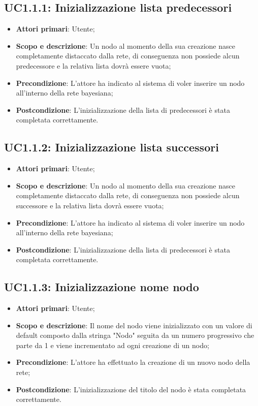 \subsection{UC1.1.1: Inizializzazione lista predecessori} 
\hypertarget{UC1.1.1}{} 
\begin{itemize} 
	\item{\textbf{Attori primari}: Utente;} 
	\item{\textbf{Scopo e descrizione}: Un nodo al momento della sua creazione nasce completamente distaccato dalla rete, di conseguenza non possiede alcun predecessore e la relativa lista dovrà essere vuota;} 
	\item{\textbf{Precondizione}: L'attore ha indicato al sistema di voler inserire un nodo all'interno della rete bayesiana;} 
	\item{\textbf{Postcondizione}: L'inizializzazione della lista di predecessori è stata completata correttamente.} 
\end{itemize} 
\subsection{UC1.1.2: Inizializzazione lista successori} 
\hypertarget{UC1.1.2}{} 
\begin{itemize} 
	\item{\textbf{Attori primari}: Utente;} 
	\item{\textbf{Scopo e descrizione}: Un nodo al momento della sua creazione nasce completamente distaccato dalla rete, di conseguenza non possiede alcun successore e la relativa lista dovrà essere vuota;} 
	\item{\textbf{Precondizione}: L'attore ha indicato al sistema di voler inserire un nodo all'interno della rete bayesiana;} 
	\item{\textbf{Postcondizione}: L'inizializzazione della lista di predecessori è stata completata correttamente.} 
\end{itemize} 
\subsection{UC1.1.3: Inizializzazione nome nodo}
\hypertarget{UC1.1.3}{}  
\begin{itemize} 
	\item{\textbf{Attori primari}: Utente;} 
	\item{\textbf{Scopo e descrizione}: Il nome del nodo viene inizializzato con un valore di default composto dalla stringa "Nodo" seguita da un numero progressivo che parte da 1 e viene incrementato ad ogni creazione di un nodo;} 
	\item{\textbf{Precondizione}: L'attore ha effettuato la creazione di un nuovo nodo della rete;} 
	\item{\textbf{Postcondizione}: L'inizializzazione del titolo del nodo è stata completata correttamente.} 
\end{itemize} 

